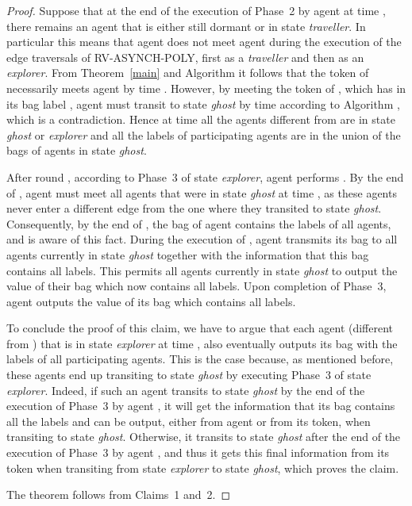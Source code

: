 \documentclass [11pt] {article}
\begin{document}
\begin{proof}
{Suppose that at the end of the execution of Phase~2 by agent  at time , there remains an agent  that is either still dormant or in state {\em traveller}. In particular this means that agent  does not meet agent  during the execution of the  edge traversals of RV-ASYNCH-POLY, first as a {\em traveller} and then as an {\em explorer}. From Theorem~\ref{main} and Algorithm  it follows that the token of  necessarily meets agent  by time . However, by meeting the token of , which has in its bag label , agent  must transit to state {\em ghost} by time  according to Algorithm , which is a contradiction. Hence at time  all the agents different from  are in state {\em ghost} or {\em explorer} and all the labels of participating agents are in the union of the bags of agents in state {\em ghost}.}

{After round , according to Phase~3 of state {\em explorer}, agent  performs . By the end of , agent  must meet all agents that
were in state {\em ghost} at time , as these agents never enter a different edge from the one where they transited to state {\em ghost}. Consequently, by the end of , the bag of agent 
contains the labels of all agents, and  is aware of this fact. 
During the execution of , agent  transmits its bag to all agents currently in state {\em ghost} together with the information
that this bag contains all labels. 
This permits all agents currently in state {\em ghost} to output the value of their bag which now contains all labels. 
Upon completion of Phase~3, agent
 outputs the value of its bag which contains all labels.}

{To conclude the proof of this claim, we have to argue that each agent (different from ) that is in state {\em explorer} at time , also eventually outputs its bag with the labels of all participating agents. This is the case because, as mentioned before, these agents end up transiting to state {\em ghost} by executing Phase~3 of state {\em explorer}. Indeed, if such an agent transits to state {\em ghost} by the end of the execution of Phase~3 by agent , it will get the information that its bag contains all the labels and can be output, either from agent  or from its token, when transiting to state {\em ghost}. Otherwise, it transits to state {\em ghost} after the end of the execution of Phase~3 by agent , and thus it gets this final information from its token when transiting from state {\em explorer} to state {\em ghost}, which proves the claim.}

{The theorem follows from Claims~1 and~2.}
\end{proof}
\end{document}
